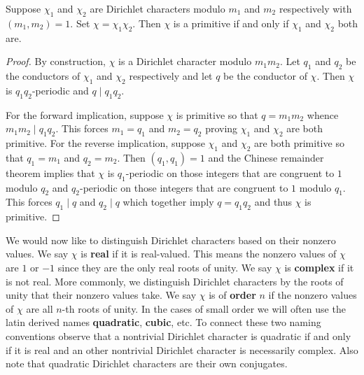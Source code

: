     \begin{proposition}\label{prop:primitive_characters_multiplicative_relatively_prime}
      Suppose \(\chi_{1}\) and \(\chi_{2}\) are Dirichlet characters modulo \(m_{1}\) and \(m_{2}\) respectively with \((m_{1},m_{2}) = 1\). Set \(\chi = \chi_{1}\chi_{2}\). Then \(\chi\) is a primitive if and only if \(\chi_{1}\) and \(\chi_{2}\) both are.
    \end{proposition}
    \begin{proof}
      By construction, \(\chi\) is a Dirichlet character modulo \(m_{1}m_{2}\). Let \(q_{1}\) and \(q_{2}\) be the conductors of \(\chi_{1}\) and \(\chi_{2}\) respectively and let \(q\) be the conductor of \(\chi\). Then \(\chi\) is \(q_{1}q_{2}\)-periodic and \(q \mid q_{1}q_{2}\).
      
      For the forward implication, suppose \(\chi\) is primitive so that \(q = m_{1}m_{2}\) whence \(m_{1}m_{2} \mid q_{1}q_{2}\). This forces \(m_{1} = q_{1}\) and \(m_{2} = q_{2}\) proving \(\chi_{1}\) and \(\chi_{2}\) are both primitive. For the reverse implication, suppose \(\chi_{1}\) and \(\chi_{2}\) are both primitive so that \(q_{1} = m_{1}\) and \(q_{2} = m_{2}\). Then \((q_{1},q_{1}) = 1\) and the Chinese remainder theorem implies that \(\chi\) is \(q_{1}\)-periodic on those integers that are congruent to \(1\) modulo \(q_{2}\) and \(q_{2}\)-periodic on those integers that are congruent to \(1\) modulo \(q_{1}\). This forces \(q_{1} \mid q\) and \(q_{2} \mid q\) which together imply \(q = q_{1}q_{2}\) and thus \(\chi\) is primitive.
    \end{proof}
    
    We would now like to distinguish Dirichlet characters based on their nonzero values. We say \(\chi\) is \textbf{real} if it is real-valued. This means the nonzero values of \(\chi\) are \(1\) or \(-1\) since they are the only real roots of unity. We say \(\chi\) is \textbf{complex} if it is not real. More commonly, we distinguish Dirichlet characters by the roots of unity that their nonzero values take. We say \(\chi\) is of \textbf{order} \(n\) if the nonzero values of \(\chi\) are all \(n\)-th roots of unity. In the cases of small order we will often use the latin derived names \textbf{quadratic}, \textbf{cubic}, etc. To connect these two naming conventions observe that a nontrivial Dirichlet character is quadratic if and only if it is real and an other nontrivial Dirichlet character is necessarily complex. Also note that quadratic Dirichlet characters are their own conjugates.
    
